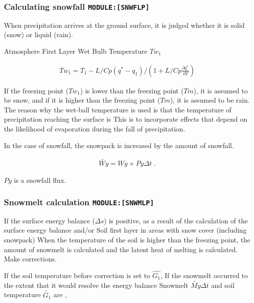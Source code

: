 \hypertarget{calculating-snowfall-modulesnwflp}{%
\subsubsection{\texorpdfstring{Calculating snowfall
\texttt{MODULE:{[}SNWFLP{]}}}{Calculating snowfall MODULE:{[}SNWFLP{]}}}\label{calculating-snowfall-modulesnwflp}}

When precipitation arrives at the ground surface, it is judged whether
it is solid (snow) or liquid (rain).

Atmosphere First Layer Wet Bulb Temperature \(Tw_1\)

\begin{eqnarray}
Tw_1 = T_1 - L / Cp ( q^* - q_1 ) / ( 1 + L / Cp \frac{\partial q^*}{\partial T} )
\end{eqnarray}

If the freezing point (\(Tw_1\)) is lower than the freezing point
(\(Tm\)), it is assumed to be snow, and if it is higher than the
freezing point (\(Tm\)), it is assumed to be rain. The reason why the
wet-ball temperature is used is that the temperature of precipitation
reaching the surface is This is to incorporate effects that depend on
the likelihood of evaporation during the fall of precipitation.

In the case of snowfall, the snowpack is increased by the amount of
snowfall.

\begin{eqnarray}
\tilde{Wy} = Wy + Py \Delta t \; .
\end{eqnarray}

\(Py\) is a snowfall flux.

\hypertarget{snowmelt-calculation-modulesnwmlp}{%
\subsubsection{\texorpdfstring{Snowmelt calculation
\texttt{MODULE:{[}SNWMLP{]}}}{Snowmelt calculation MODULE:{[}SNWMLP{]}}}\label{snowmelt-calculation-modulesnwmlp}}

If the surface energy balance (\(\Delta s\)) is positive, as a result of
the calculation of the surface energy balance and/or Soil first layer in
areas with snow cover (including snowpack) When the temperature of the
soil is higher than the freezing point, the amount of snowmelt is
calculated and the latent heat of melting is calculated. Make
corrections.

If the soil temperature before correction is set to \(\hat{G_1}\), If
the snowmelt occurred to the extent that it would resolve the energy
balance Snowmelt \(\tilde{My} \Delta t\) and soil temperature
\(\tilde{G_1}\) are ,

